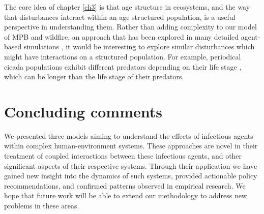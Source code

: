 The core idea of chapter \ref{ch3} is that age structure in ecosystems, and the way that disturbances interact within an age structured population, is a useful perspective in understanding them. Rather than adding complexity to our model of MPB and wildfire, an approach that has been explored in many detailed agent-based simulations \cite{caldwell2013simulated,perrakis2014modeling,ager2007modeling,loehman2017interactions}, it would be interesting to explore similar disturbances which might have interactions on a structured population. For example, periodical cicada populations exhibit different predators depending on their life stage \cite{lloyd1966periodical}, which can be longer than the life stage of their predators. 

\section{Concluding comments}

We presented three models aiming to understand the effects of infectious agents within complex human-environment systems. These approaches are novel in their treatment of coupled interactions between these infectious agents, and other significant aspects of their respective systems. Through their application we have gained new insight into the dynamics of such systems, provided actionable policy recommendations, and confirmed patterns observed in empirical research. We hope that future work will be able to extend our methodology to address new problems in these areas.